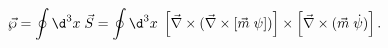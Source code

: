\begin{equation}
\vec \wp = \oint \d^3 x \; \vec S = \oint \d^3 x \;
\left[\vec\nabla\times(\vec\nabla\times[\vec m\; \psi])\right] 
\times
\left[ \vec\nabla\times(\vec m\; \dot\psi) \right].
\end{equation}

